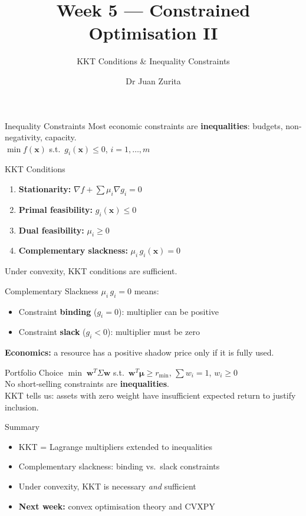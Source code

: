 \documentclass[aspectratio=169, 10pt]{beamer}
\title{Week 5 --- Constrained Optimisation II}
\subtitle{KKT Conditions \& Inequality Constraints}
\author{Dr Juan Zurita}
\institute{Optimisation \& Mathematical Methods for Economics\\
The University of Edinburgh~$\cdot$~School of Economics}
\date{}
\begin{document}
\maketitle

\begin{frame}{Inequality Constraints}
Most economic constraints are \textbf{inequalities}: budgets, non-negativity, capacity.\\\bigskip $\min f(\mathbf{x})$ s.t.\ $g_i(\mathbf{x}) \leq 0$, $i=1,\ldots,m$
\end{frame}

\begin{frame}{KKT Conditions}
\begin{enumerate}\item \textbf{Stationarity:} $\nabla f + \sum\mu_i\nabla g_i = 0$\item \textbf{Primal feasibility:} $g_i(\mathbf{x}) \leq 0$\item \textbf{Dual feasibility:} $\mu_i \geq 0$\item \textbf{Complementary slackness:} $\mu_i\,g_i(\mathbf{x}) = 0$\end{enumerate}\par\bigskip Under convexity, KKT conditions are \alert{sufficient}.
\end{frame}

\begin{frame}{Complementary Slackness}
$\mu_i\,g_i = 0$ means:\\\bigskip\begin{itemize}\item Constraint \textbf{binding} ($g_i = 0$): multiplier can be positive\item Constraint \textbf{slack} ($g_i < 0$): multiplier must be zero\end{itemize}\par\bigskip\textbf{Economics:} a resource has a positive shadow price only if it is fully used.
\end{frame}

\begin{frame}{Portfolio Choice}
$\min\;\mathbf{w}^T\Sigma\mathbf{w}$ s.t.\ $\mathbf{w}^T\boldsymbol{\mu} \geq r_{\min}$, $\sum w_i = 1$, $w_i \geq 0$\\\bigskip No short-selling constraints are \textbf{inequalities}.\\\bigskip KKT tells us: assets with zero weight have insufficient expected return to justify inclusion.
\end{frame}

\begin{frame}{Summary}
\begin{itemize}\item KKT = Lagrange multipliers extended to inequalities\item Complementary slackness: binding vs.\ slack constraints\item Under convexity, KKT is necessary \textit{and} sufficient\item \textbf{Next week:} convex optimisation theory and CVXPY\end{itemize}
\end{frame}
\end{document}
